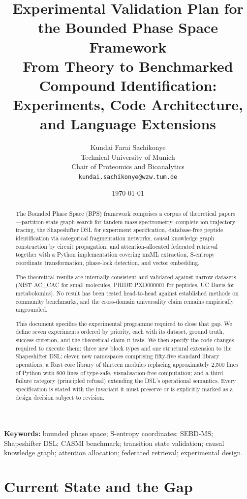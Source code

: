 \documentclass[11pt,a4paper]{article}
\title{\textbf{Experimental Validation Plan for the Bounded Phase Space
Framework}\\[6pt]
\large From Theory to Benchmarked Compound Identification:\\
Experiments, Code Architecture, and Language Extensions}
\author{
Kundai Farai Sachikonye\\
\small Technical University of Munich\\
\small Chair of Proteomics and Bioanalytics\\
\small \texttt{kundai.sachikonye@wzw.tum.de}}
\date{\today}
\theoremstyle{planstyle}
\theoremstyle{definition}
\theoremstyle{remark}
\begin{document}
\maketitle

\begin{abstract}
\noindent
The Bounded Phase Space (BPS) framework comprises a corpus of
theoretical papers---partition-state graph search for tandem mass
spectrometry, complete ion trajectory tracing, the Shapeshifter DSL for
experiment specification, database-free peptide identification via
categorical fragmentation networks, causal knowledge graph construction
by circuit propagation, and attention-allocated federated retrieval---together
with a Python implementation covering mzML extraction, S-entropy
coordinate transformation, phase-lock detection, and vector embedding.

The theoretical results are internally consistent and validated against
narrow datasets (NIST AC\_CAC for small molecules, PRIDE PXD000001 for
peptides, UC Davis for metabolomics). No result has been tested
head-to-head against established methods on community benchmarks, and
the cross-domain universality claim remains empirically ungrounded.

This document specifies the experimental programme required to close
that gap. We define seven experiments ordered by priority, each with
its dataset, ground truth, success criterion, and the theoretical claim
it tests. We then specify the code changes required to execute them:
three new block types and one structural extension to the Shapeshifter
DSL; eleven new namespaces comprising fifty-five standard library
operations; a Rust core library of thirteen modules replacing
approximately 2,500 lines of Python with 800 lines of type-safe,
visualisation-free computation; and a third failure category (principled
refusal) extending the DSL's operational semantics. Every specification
is stated with the invariant it must preserve or is explicitly marked as
a design decision subject to revision.
\end{abstract}

\noindent\textbf{Keywords:} bounded phase space; S-entropy coordinates;
SEBD-MS; Shapeshifter DSL; CASMI benchmark; transition state validation;
causal knowledge graph; attention allocation; federated retrieval;
experimental design.

\tableofcontents
\clearpage

\part{Current State and the Gap}
\end{document}
